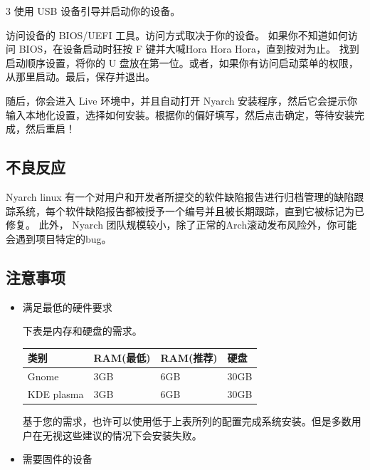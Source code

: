 \documentclass{article}
\begin{document}
\begin{multicols*}{3}
	使用 USB 设备引导并启动你的设备。

	访问设备的 BIOS/UEFI 工具。访问方式取决于你的设备。 如果你不知道如何访问 BIOS，在设备启动时狂按 F 键并大喊Hora Hora Hora，直到按对为止。
	找到启动顺序设置，将你的 U 盘放在第一位。或者，如果你有访问启动菜单的权限，从那里启动。最后，保存并退出。

	随后，你会进入 Live 环境中，并且自动打开 Nyarch 安装程序，然后它会提示你输入本地化设置，选择如何安装。根据你的偏好填写，然后点击确定，等待安装完成，然后重启！
	\medskip	

	\begin{tcolorbox}
	\section*{不良反应}
	\end{tcolorbox}

	Nyarch linux 有一个对用户和开发者所提交的软件缺陷报告进行归档管理的缺陷跟踪系统，每个软件缺陷报告都被授予一个编号并且被长期跟踪，直到它被标记为已修复。
	此外， Nyarch 团队规模较小，除了正常的Arch滚动发布风险外，你可能会遇到项目特定的bug。

	\medskip


	\begin{tcolorbox}
	\section*{注意事项}
	\end{tcolorbox}
	\begin{itemize}[leftmargin=*]

		\item 满足最低的硬件要求

		下表是内存和硬盘的需求。

		{\small\begin{tabularx}{\linewidth}{|X|X|X|X|}
			\hline
			类别 & RAM\newline (最低) & RAM\newline (推荐) & 硬盘 \\
			\hline
			Gnome & 3GB & 6GB & 30GB \\
			\hline
			KDE plasma & 3GB & 6GB & 30GB \\
			\hline
		\end{tabularx}}

		基于您的需求，也许可以使用低于上表所列的配置完成系统安装。但是多数用户在无视这些建议的情况下会安装失败。

		\item 需要固件的设备


\end{itemize}
\end{multicols*}
\end{document}
